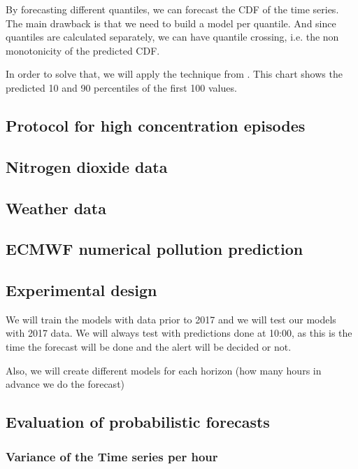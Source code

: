 \documentclass[a4paper,twocolumn,5p]{elsarticle}
\begin{document}
By forecasting different quantiles, we
can forecast the CDF of the time series. 
The main drawback is that we need to build a model per quantile. And since quantiles are calculated separately, 
we can have quantile crossing, i.e. the non monotonicity of the predicted CDF. 

In order to solve that, we will apply the technique from . This chart shows the predicted 10 and 90 
percentiles of the first 100 values.

\label{sec:mm}

\subsection{Protocol for high \no concentration episodes}
\label{sec:madr-prot-high}


\subsection{Nitrogen dioxide data}
\label{sec:no2}


\subsection{Weather data}
\label{sec:weather-data}

\subsection{ECMWF numerical pollution prediction}
\label{sec:ecmwf-numer-poll}


\subsection{Experimental design}
\label{sec:experimental-design}

We will train the models with data prior to 2017 and we will test our models with 2017 data. We will always test with 
predictions done at 10:00, as this is the time the forecast will be done and the alert will be decided or not.

Also, we will create different models for each horizon (how many hours in advance we do the forecast)

\subsection{Evaluation of probabilistic forecasts}

\subsubsection{Variance of the Time series per hour}
\end{document}

